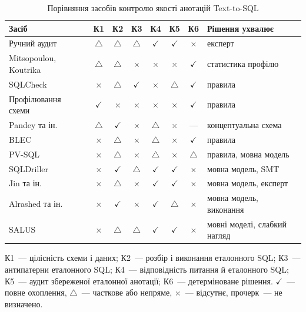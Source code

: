 \documentclass[a4paper,14pt,oneside]{extreport}
\begin{document}
\begin{table}[htbp]
  \caption{Порівняння засобів контролю якості анотацій Text-to-SQL}
  \label{tab:audit-means}
  \small
  \renewcommand{\arraystretch}{1.15}
  \setlength{\tabcolsep}{4pt}
  \begin{tabularx}{\textwidth}{@{}>{\raggedright\arraybackslash}X cccccc >{\raggedright\arraybackslash}p{3.2cm}@{}}
    \toprule
    Засіб & К1 & К2 & К3 & К4 & К5 & К6 & Рішення ухвалює \\
    \midrule
    Ручний аудит~\cite{pourreza2023evaluating,wretblad2024noise} &
    $\triangle$ & $\triangle$ & $\triangle$ & $\checkmark$ & $\checkmark$ & $\times$ & експерт \\
    Mitsopoulou, Koutrika~\cite{mitsopoulou2025analysis} &
    $\triangle$ & $\triangle$ & $\times$ & $\times$ & $\times$ & $\checkmark$ & статистика профілю \\
    \midrule
    SQLCheck~\cite{dintyala2020sqlcheck} &
    $\times$ & $\triangle$ & $\checkmark$ & $\times$ & $\triangle$ & $\checkmark$ & правила \\
    Профілювання схеми~\cite{abedjan2015profiling,memari2015sql,schemacrawler} &
    $\checkmark$ & $\times$ & $\times$ & $\times$ & $\times$ & $\checkmark$ & правила \\
    Pandey та ін.~\cite{pandey2024validation} &
    $\triangle$ & $\checkmark$ & $\times$ & $\triangle$ & $\times$ & --- & концептуальна схема \\
    BLEC~\cite{shu2021blec} &
    $\times$ & $\triangle$ & $\times$ & $\triangle$ & $\times$ & $\checkmark$ & правила \\
    PV-SQL~\cite{tian2026pvsql} &
    $\times$ & $\triangle$ & $\times$ & $\triangle$ & $\times$ & $\triangle$ & правила, мовна модель \\
    \midrule
    SQLDriller~\cite{yang2025sqldriller} &
    $\times$ & $\checkmark$ & $\triangle$ & $\checkmark$ & $\checkmark$ & $\times$ & мовна модель, SMT \\
    Jin та ін.~\cite{jin2026annotation} &
    $\times$ & $\triangle$ & $\times$ & $\checkmark$ & $\checkmark$ & $\times$ & мовна модель, експерт \\
    Alrashed та ін.~\cite{alrashed2026verification} &
    $\times$ & $\checkmark$ & $\times$ & $\checkmark$ & $\triangle$ & $\times$ & мовна модель, виконання \\
    SALUS~\cite{zhou2026salus} &
    $\times$ & $\triangle$ & $\triangle$ & $\checkmark$ & $\checkmark$ & $\times$ & мовні моделі, слабкий нагляд \\
    \bottomrule
  \end{tabularx}

  \vspace{4pt}
  {\footnotesize\raggedright
  К1~--- цілісність схеми і даних; К2~--- розбір і виконання еталонного SQL; К3~--- антипатерни еталонного SQL; К4~--- відповідність питання й еталонного SQL; К5~--- аудит збереженої еталонної анотації; К6~--- детерміноване рішення. $\checkmark$~--- повне охоплення, $\triangle$~--- часткове або непряме, $\times$~--- відсутнє, прочерк~--- не визначено.\par}
\end{table}
\end{document}
